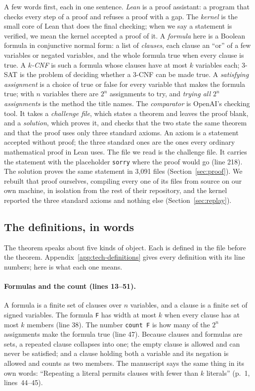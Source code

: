 A few words first, each in one sentence.
\emph{Lean} is a proof assistant: a program that checks every step of a
proof and refuses a proof with a gap.
The \emph{kernel} is the small core of Lean that does the final
checking; when we say a statement is verified, we mean the kernel
accepted a proof of it.
A \emph{formula} here is a Boolean formula in conjunctive normal form: a
list of \emph{clauses}, each clause an ``or'' of a few variables or
negated variables, and the whole formula true when every clause is
true. A \emph{$k$-CNF} is such a formula whose clauses have at most $k$
variables each; 3-SAT is the problem of deciding whether a 3-CNF can be
made true.
A \emph{satisfying assignment} is a choice of true or false for every
variable that makes the formula true; with $n$ variables there are
$2^n$ assignments to try, and \emph{trying all $2^n$ assignments} is the
method the title names.
The \emph{comparator} is OpenAI's checking tool. It takes a
\emph{challenge file}, which states a theorem and leaves the proof blank,
and a \emph{solution}, which proves it, and checks that the two state
the same theorem and that the proof uses only three standard axioms. An axiom is a statement accepted without proof; the three standard ones are the ones every ordinary mathematical proof in Lean uses.
The file we read is the challenge file. It carries the statement with
the placeholder \texttt{sorry} where the proof would go (line 218). The
solution proves the same statement in 3,091 files
(Section~\ref{sec:proof}). We rebuilt that proof ourselves, compiling
every one of its files from source on our own machine, in isolation from
the rest of their repository, and the
kernel reported the three standard axioms and nothing else
(Section~\ref{sec:replay}).

\subsection{The definitions, in words}
\label{sec:statement-definitions}

The theorem speaks about five kinds of object. Each is defined in the
file before the theorem. Appendix~\ref{app:tech-definitions} gives
every definition with its line numbers; here is what each one means.

\paragraph{Formulas and the count (lines 13--51).}
A formula is a finite set of clauses over $n$ variables, and a clause is
a finite set of signed variables. The formula \texttt{F} has width at
most $k$ when every clause has at most $k$ members (line 38). The number
\texttt{count F} is how many of the $2^n$ assignments make the formula
true (line 47). Because clauses and formulas are sets, a repeated clause
collapses into one; the empty clause is allowed and can never be
satisfied; and a clause holding both a variable and its negation is
allowed and counts as two members. The manuscript says the same thing in
its own words: ``Repeating a literal permits clauses with fewer than
\(k\) literals'' (p.~1, lines~44--45).

